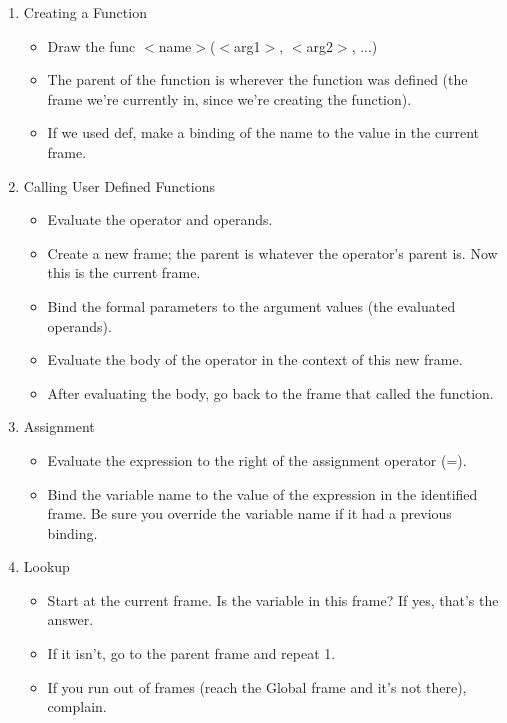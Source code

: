 \begin{blocksection}

\begin{enumerate}
    \item Creating a Function
        \begin{itemize}
            \item Draw the func $<$name$>$($<$arg1$>$, $<$arg2$>$, ...)
            \item The parent of the function is wherever the function was defined (the frame we're currently in, since we're creating the function).
            \item If we used def, make a binding of the name to the value in the current frame.
        \end{itemize}
    \item Calling User Defined Functions
		\begin{itemize}
			\item Evaluate the operator and operands.
			\item Create a new frame; the parent is whatever the operator's parent is. Now this is the current frame.
			\item Bind the formal parameters to the argument values (the evaluated operands).
			\item Evaluate the body of the operator in the context of this new frame.
			\item After evaluating the body, go back to the frame that called the function.
		\end{itemize}
    \item Assignment
    		\begin{itemize}
    			\item Evaluate the expression to the right of the assignment operator (=).
			\item Bind the variable name to the value of the expression in the identified frame. Be sure you override the variable name if it had a previous binding.
    		\end{itemize}
    	\item Lookup
    		\begin{itemize}
    			\item Start at the current frame. Is the variable in this frame? If yes, that's the answer.
			\item If it isn't, go to the parent frame and repeat 1.
			\item If you run out of frames (reach the Global frame and it's not there), complain.
    		\end{itemize}
\end{enumerate}
\end{blocksection}
